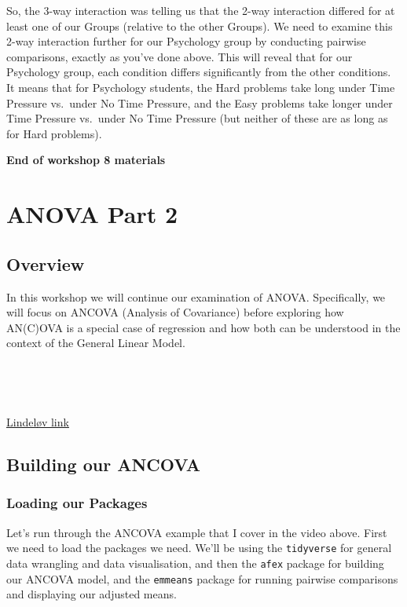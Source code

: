 \documentclass[
]{book}
\begin{document}
So, the 3-way interaction was telling us that the 2-way interaction differed for at least one of our Groups (relative to the other Groups). We need to examine this 2-way interaction further for our Psychology group by conducting pairwise comparisons, exactly as you've done above. This will reveal that for our Psychology group, each condition differs significantly from the other conditions. It means that for Psychology students, the Hard problems take long under Time Pressure vs.~under No Time Pressure, and the Easy problems take longer under Time Pressure vs.~under No Time Pressure (but neither of these are as long as for Hard problems).

\textbf{End of workshop 8 materials}

\hypertarget{anova-part-2}{%
\chapter{ANOVA Part 2}\label{anova-part-2}}

\hypertarget{overview-4}{%
\section{Overview}\label{overview-4}}

In this workshop we will continue our examination of ANOVA. Specifically, we will focus on ANCOVA (Analysis of Covariance) before exploring how AN(C)OVA is a special case of regression and how both can be understood in the context of the General Linear Model.

~~

~~

\href{https://lindeloev.github.io/tests-as-linear/}{Lindeløv link}

\hypertarget{building-our-ancova}{%
\section{Building our ANCOVA}\label{building-our-ancova}}

\hypertarget{loading-our-packages-1}{%
\subsection{Loading our Packages}\label{loading-our-packages-1}}

Let's run through the ANCOVA example that I cover in the video above. First we need to load the packages we need. We'll be using the \texttt{tidyverse} for general data wrangling and data visualisation, and then the \texttt{afex} package for building our ANCOVA model, and the \texttt{emmeans} package for running pairwise comparisons and displaying our adjusted means.
\end{document}
